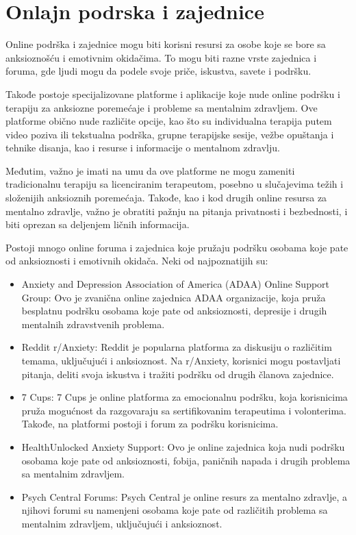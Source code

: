 \documentclass[a4paper]{article}
\begin{document}
\section{Onlajn podrska i zajednice}
\label{sec:onlajnPodrska}
Online podrška i zajednice mogu biti korisni resursi za osobe koje se bore sa anksioznošću i emotivnim okidačima. To mogu biti razne vrste zajednica i foruma, gde ljudi mogu da podele svoje priče, iskustva, savete i podršku.

Takođe postoje specijalizovane platforme i aplikacije koje nude online podršku i terapiju za anksiozne poremećaje i probleme sa mentalnim zdravljem. Ove platforme obično nude različite opcije, kao što su individualna terapija putem video poziva ili tekstualna podrška, grupne terapijske sesije, vežbe opuštanja i tehnike disanja, kao i resurse i informacije o mentalnom zdravlju.

Međutim, važno je imati na umu da ove platforme ne mogu zameniti tradicionalnu terapiju sa licenciranim terapeutom, posebno u slučajevima težih i složenijih anksioznih poremećaja. Takođe, kao i kod drugih online resursa za mentalno zdravlje, važno je obratiti pažnju na pitanja privatnosti i bezbednosti, i biti oprezan sa deljenjem ličnih informacija.

Postoji mnogo online foruma i zajednica koje pružaju podršku osobama koje pate od anksioznosti i emotivnih okidača. Neki od najpoznatijih su:
\begin{itemize}
\item Anxiety and Depression Association of America (ADAA) Online Support Group: Ovo je zvanična online zajednica ADAA organizacije, koja pruža besplatnu podršku osobama koje pate od anksioznosti, depresije i drugih mentalnih zdravstvenih problema.
\item Reddit r/Anxiety: Reddit je popularna platforma za diskusiju o različitim temama, uključujući i anksioznost. Na r/Anxiety, korisnici mogu postavljati pitanja, deliti svoja iskustva i tražiti podršku od drugih članova zajednice.
\item 7 Cups: 7 Cups je online platforma za emocionalnu podršku, koja korisnicima pruža mogućnost da razgovaraju sa sertifikovanim terapeutima i volonterima. Takođe, na platformi postoji i forum za podršku korisnicima.
\item HealthUnlocked Anxiety Support: Ovo je online zajednica koja nudi podršku osobama koje pate od anksioznosti, fobija, paničnih napada i drugih problema sa mentalnim zdravljem.
\item Psych Central Forums: Psych Central je online resurs za mentalno zdravlje, a njihovi forumi su namenjeni osobama koje pate od različitih problema sa mentalnim zdravljem, uključujući i anksioznost.
\end{itemize}
\end{document}
